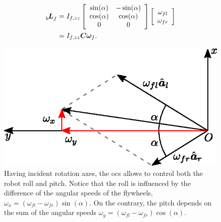 \documentclass[letterpaper, 10 pt, conference]{ieeeconf}      %
\begin{document}
\begin{equation}
\begin{split}
\tensor[_b]{\bm{L}}{_f} & = I_{f,zz}
\left[
\begin{array}{cc}
\sin(\alpha) & -\sin(\alpha) \\
\cos(\alpha) & \cos(\alpha) \\
0 & 0
\end{array}
\right]
\left[
\begin{array}{cc}
\omega_{fl} \\
\omega_{fr}
\end{array}
\right] \\
&= I_{f,zz} \bm{C} \bm{\omega}_f.
\end{split}
\end{equation}
\begin{figure}
	\centering
	\includegraphics[width=.8\linewidth]{figures/sum_diff_mod.eps}
	\caption{\small Having incident rotation axes, the \gls{ocs} allows to control both the robot roll and pitch. Notice that the roll is influenced by the difference of the angular speeds of the flywheels, $\omega_x = \left(\omega_{fl} - \omega_{fr}\right)\sin(\alpha)$. On the contrary, the pitch depends on the sum of the angular speeds $\omega_y = \left(\omega_{fl} -  \omega_{fr}\right)\cos(\alpha)$.}
	\label{fig:sum-diff}
\end{figure}
\end{document}
